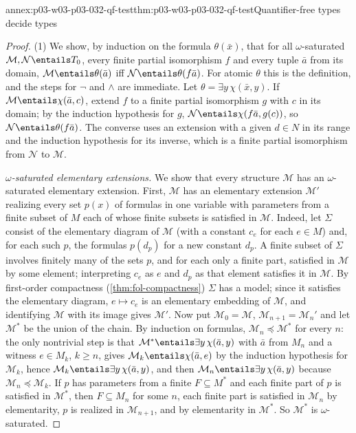 \begin{annexitem}{annex:p03-w03-p03-032-qf-test}{thm:p03-w03-p03-032-qf-test}{Quantifier-free types decide types}
\begin{proof}
(1) We show, by induction on the formula \(\theta(\bar x)\), that for all
\(\omega\)-saturated \(\mathcal M,\mathcal N\entails T_0\), every finite
partial isomorphism \(f\) and every tuple \(\bar a\) from its domain,
\(\mathcal M\entails\theta(\bar a)\) iff \(\mathcal N\entails\theta(f\bar a)\).
For atomic \(\theta\) this is the definition, and the steps for \(\neg\) and
\(\wedge\) are immediate.  Let \(\theta=\exists y\,\chi(\bar x,y)\).  If
\(\mathcal M\entails\chi(\bar a,c)\), extend \(f\) to a finite partial
isomorphism \(g\) with \(c\) in its domain; by the induction hypothesis for
\(g\), \(\mathcal N\entails\chi(f\bar a,g(c))\), so
\(\mathcal N\entails\theta(f\bar a)\).  The converse uses an extension with a
given \(d\in N\) in its range and the induction hypothesis for its inverse,
which is a finite partial isomorphism from \(\mathcal N\) to \(\mathcal M\).

\emph{\(\omega\)-saturated elementary extensions.}  We show that every
structure \(\mathcal M\) has an \(\omega\)-saturated elementary extension.
First, \(\mathcal M\) has an elementary extension \(\mathcal M'\) realizing
every set \(p(x)\) of formulas in one variable with parameters from a finite
subset of \(M\) each of whose finite subsets is satisfied in \(\mathcal M\).
Indeed, let \(\Sigma\) consist of the elementary diagram of \(\mathcal M\)
(with a constant \(c_e\) for each \(e\in M\)) and, for each such \(p\), the
formulas \(p(d_p)\) for a new constant \(d_p\).  A finite subset of
\(\Sigma\) involves finitely many of the sets \(p\), and for each only a
finite part, satisfied in \(\mathcal M\) by some element; interpreting
\(c_e\) as \(e\) and \(d_p\) as that element satisfies it in \(\mathcal M\).
By first-order compactness (\cref{thm:fol-compactness}) \(\Sigma\) has a
model; since it satisfies the elementary diagram, \(e\mapsto c_e\) is an
elementary embedding of \(\mathcal M\), and identifying \(\mathcal M\) with
its image gives \(\mathcal M'\).  Now put \(\mathcal M_0=\mathcal M\),
\(\mathcal M_{n+1}=\mathcal M_n'\) and let \(\mathcal M^*\) be the union of
the chain.  By induction on formulas, \(\mathcal M_n\preccurlyeq\mathcal
M^*\) for every \(n\): the only nontrivial step is that
\(\mathcal M^*\entails\exists y\,\chi(\bar a,y)\) with \(\bar a\) from
\(M_n\) and a witness \(e\in M_k\), \(k\geq n\), gives
\(\mathcal M_k\entails\chi(\bar a,e)\) by the induction hypothesis for
\(\mathcal M_k\), hence \(\mathcal M_k\entails\exists y\,\chi(\bar a,y)\), and
then \(\mathcal M_n\entails\exists y\,\chi(\bar a,y)\) because
\(\mathcal M_n\preccurlyeq\mathcal M_k\).  If \(p\) has parameters from a
finite \(F\subseteq M^*\) and each finite part of \(p\) is satisfied in
\(\mathcal M^*\), then \(F\subseteq M_n\) for some \(n\), each finite part is
satisfied in \(\mathcal M_n\) by elementarity, \(p\) is realized in
\(\mathcal M_{n+1}\), and by elementarity in \(\mathcal M^*\).  So
\(\mathcal M^*\) is \(\omega\)-saturated.


\end{proof}
\end{annexitem}
